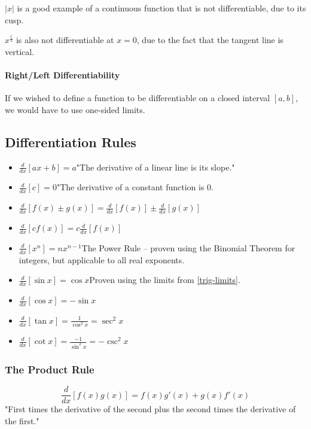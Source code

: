 \documentclass{article}
\begin{document}
$|x|$ is a good example of a continuous function that is not differentiable, due to its cusp.

$x^\frac{1}{3}$ is also not differentiable at $x=0$, due to the fact that the tangent line is vertical.

\paragraph{Right/Left Differentiability}
If we wished to define a function to be differentiable on a closed interval $[a,b]$, we would have to use one-sided limits.


\subsection{Differentiation Rules}
\begin{itemize}
    \item $\frac{d}{dx}\left[ax+b\right] = a$\quad"The derivative of a linear line is its slope."
    \item $\frac{d}{dx}\left[c\right] = 0$\quad"The derivative of a constant function is 0.
    \item $\frac{d}{dx}\left[f(x) \pm g(x)\right] = \frac{d}{dx}\left[f(x)\right] \pm \frac{d}{dx}\left[g(x)\right]$
    \item $\frac{d}{dx}\left[cf(x)\right] = c\frac{d}{dx}\left[f(x)\right]$
    \item $\frac{d}{dx}\left[x^n\right] = nx^{n-1}$\quad The Power Rule -- proven using the Binomial Theorem for integers, but applicable to all real exponents.
    \item $\frac{d}{dx}\left[\sin{x}\right] = \cos{x}$\quad Proven using the limits from \ref{trig-limits}.
    \item $\frac{d}{dx}\left[\cos{x}\right] = -\sin{x}$
    \item $\frac{d}{dx}\left[\tan{x}\right] = \frac{1}{\cos^2{x}} = \sec^2{x}$
    \item $\frac{d}{dx}\left[\cot{x}\right] = \frac{-1}{\sin^2{x}} = -\csc^2{x}$
\end{itemize}

\subsubsection{The Product Rule}
$$\frac{d}{dx}\left[f(x)g(x)\right] = f(x)g'(x) + g(x)f'(x)$$
"First times the derivative of the second plus the second times the derivative of the first."
\end{document}
